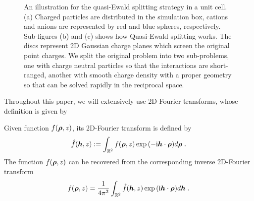 \begin{figure}
    \caption{
        An illustration for the quasi-Ewald splitting strategy in a unit cell.
        (a) Charged particles are distributed in the simulation box, cations and anions are represented by red and blue spheres, respectively.
        Sub-figures (b) and (c) shows how Quasi-Ewald splitting works. 
        The discs represent 2D Gaussian charge planes which screen the original point charges.
        We split the original problem into two sub-problems, one with charge neutral particles so that the interactions are short-ranged, another with smooth charge density with a proper geometry so that can be solved rapidly in the reciprocal space.
    }
    \label{fig:QuasiEwaldSplitting}
\end{figure}
Throughout this paper, we will extensively use 2D-Fourier transforms, whose definition is given by
\begin{defination}
    Given function $f(\boldsymbol{\rho}, z)$, its 2D-Fourier transform is defined by
    \begin{equation}
        \Hat{f}(\boldsymbol{h}, z):=\int_{\mathbb{R}^2}f(\boldsymbol{\rho},z)\exp{(-\mathrm{i} \boldsymbol{h} \cdot \boldsymbol{\rho})} d \boldsymbol{\rho} \;.
    \end{equation}
    The function  $f(\boldsymbol{\rho}, z)$ can be  recovered from the corresponding inverse 2D-Fourier transform
    \begin{equation} 
        f(\boldsymbol{\rho}, z)=\frac{1}{4\pi^2}\int_{\mathbb{R}^2}\Hat{f}(\boldsymbol{h}, z)\exp{(\mathrm{i} \boldsymbol{h} \cdot \boldsymbol{\rho})} d \boldsymbol{h} \;.
    \end{equation}
\end{defination} 
